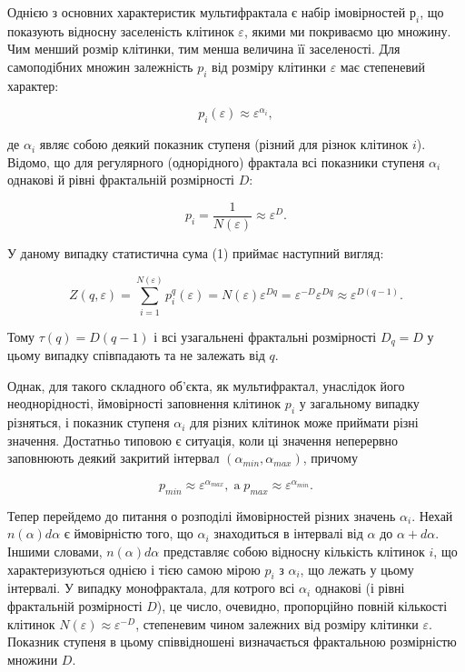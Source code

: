 \documentclass[
  letterpaper,
]{report}
\begin{document}
Однією з основних характеристик мультифрактала є набір імовірностей
\(р_{i}\), що показують відносну заселеність клітинок \(\varepsilon\),
якими ми покриваємо цю множину. Чим менший розмір клітинки, тим менша
величина її заселеності. Для самоподібних множин залежність \(p_{i}\)
від розміру клітинки \(\varepsilon\) має степеневий характер:

\[
p_{i}(\varepsilon) \approx \varepsilon^{\alpha_{i}}, 
\]

де \(\alpha_{i}\) являє собою деякий показник ступеня (різний для різнок
клітинок \(i\)). Відомо, що для регулярного (однорідного) фрактала всі
показники ступеня \(\alpha_{i}\) однакові й рівні фрактальній
розмірності \(D\):

\[
p_{i} = \frac{1}{N(\varepsilon)} \approx \varepsilon^{D}.
\]

У даному випадку статистична сума (1) приймає наступний вигляд:

\[
Z(q,\varepsilon) = \sum_{i=1}^{N(\varepsilon)}p_{i}^{q}(\varepsilon) = N(\varepsilon)\varepsilon^{Dq}=\varepsilon^{-D}\varepsilon^{Dq} \approx \varepsilon^{D(q-1)}. 
\]

Тому \(\tau(q)=D(q-1)\) і всі узагальнені фрактальні розмірності
\(D_{q}=D\) у цьому випадку співпадають та не залежать від \(q\).

Однак, для такого складного об'єкта, як мультифрактал, унаслідок його
неоднорідності, ймовірності заповнення клітинок \(p_{i}\) у загальному
випадку різняться, і показник ступеня \(\alpha_{i}\) для різних клітинок
може приймати різні значення. Достатньо типовою є ситуація, коли ці
значення неперервно заповнюють деякий закритий інтервал
\(\left( \alpha_{min}, \alpha_{max} \right)\), причому

\[
p_{min} \approx \varepsilon^{\alpha_{max}}, \; \text{a} \; p_{max} \approx \varepsilon^{\alpha_{min}}. 
\]

Тепер перейдемо до питання о розподілі ймовірностей різних значень
\(\alpha_{i}\). Нехай \(n(\alpha)d\alpha\) є ймовірністю того, що
\(\alpha_{i}\) знаходиться в інтервалі від \(\alpha\) до
\(\alpha+d\alpha\). Іншими словами, \(n(\alpha)d\alpha\) представляє
собою відносну кількість клітинок \(i\), що характеризуються однією і
тією самою мірою \(p_{i}\) з \(\alpha_{i}\), що лежать у цьому
інтервалі. У випадку монофрактала, для котрого всі \(\alpha_{i}\)
однакові (і рівні фрактальній розмірності \(D\)), це число, очевидно,
пропорційно повній кількості клітинок
\(N(\varepsilon) \approx \varepsilon^{-D}\), степеневим чином залежних
від розміру клітинки \(\varepsilon\). Показник ступеня в цьому
співвідношені визначається фрактальною розмірністю множини \(D\).
\end{document}
